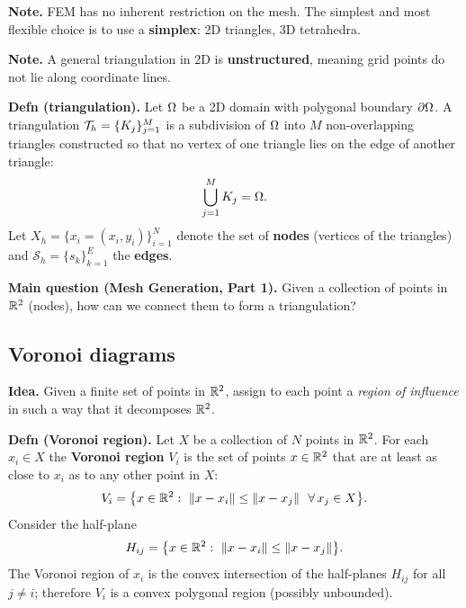 \textbf{Note.} FEM has no inherent restriction on the mesh. The simplest and
most flexible choice is to use a \textbf{simplex}: 2D triangles, 3D
tetrahedra.

\medskip\noindent
\textbf{Note.} A general triangulation in 2D is \textbf{unstructured}, meaning
grid points do not lie along coordinate lines.

\medskip\noindent
\textbf{Defn (triangulation).} Let $\Omega$ be a 2D domain with polygonal
boundary $\partial\Omega$. A triangulation $\mathcal{T}_{h}=\{K_{j}\}_{j=1}^{M}$ is a subdivision of
$\Omega$ into $M$ non-overlapping triangles constructed so that no vertex of one
triangle lies on the edge of another triangle:
\begin{equation}\label{eq:l13tri}
  \bigcup_{j=1}^{M}K_{j}=\Omega .
\end{equation}
Let $X_{h}=\{x_{i}=(x_{i},y_{i})\}_{i=1}^{N}$ denote the set of \textbf{nodes}
(vertices of the triangles) and $\mathcal{S}_{h}=\{s_{k}\}_{k=1}^{E}$ the
\textbf{edges}.

\medskip\noindent
\textbf{Main question (Mesh Generation, Part 1).} Given a collection of points
in $\mathbb{R}^{2}$ (nodes), how can we connect them to form a triangulation?

\subsection*{Voronoi diagrams}

\textbf{Idea.} Given a finite set of points in $\mathbb{R}^{2}$, assign to each point a
\emph{region of influence} in such a way that it decomposes $\mathbb{R}^{2}$.

\medskip\noindent
\textbf{Defn (Voronoi region).} Let $X$ be a collection of $N$ points in
$\mathbb{R}^{2}$. For each $x_{i}\in X$ the \textbf{Voronoi region} $V_{i}$ is the set
of points $x\in\mathbb{R}^{2}$ that are at least as close to $x_{i}$ as to any other
point in $X$:
\begin{equation}\label{eq:l13voronoi}
  V_{i}=\bigl\{x\in\R^{2}:\ \|x-x_{i}\|\le\|x-x_{j}\|\ \ \forall\,x_{j}\in X\bigr\} .
\end{equation}
Consider the half-plane
\begin{equation}\label{eq:l13halfplane}
  H_{ij}=\bigl\{x\in\mathbb{R}^{2}:\ \|x-x_{i}\|\le\|x-x_{j}\|\bigr\} .
\end{equation}
The Voronoi region of $x_{i}$ is the convex intersection of the half-planes
$H_{ij}$ for all $j\neq i$; therefore $V_{i}$ is a convex polygonal region
(possibly unbounded).

